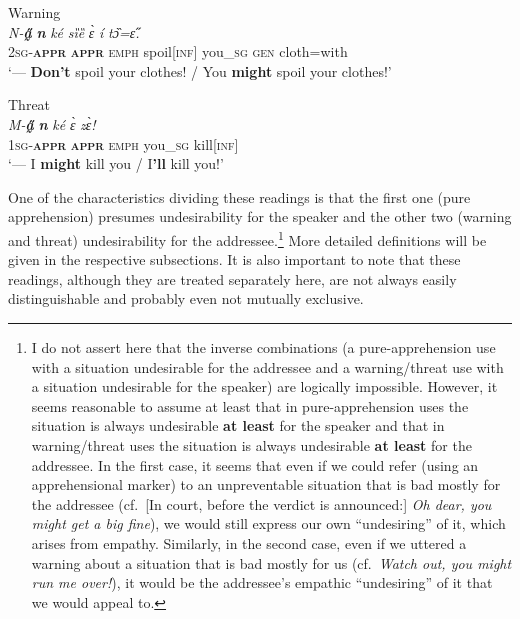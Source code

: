 \documentclass[output=paper,colorlinks,citecolor=brown
]{langscibook}
\begin{document}
\begin{exe} \ex \label{ex:Fed8} \textnormal{Warning} \\
\gll \textit{N-\textbf{a̰̋}} \textit{\textbf{n{\ù}}} \textit{ké} \textit{sȉȅ} \textit{ɛ̀} \textit{í} \textit{tɔ̏=ɛ̋.} \\
\textsc{2sg-\textbf{appr}} \textbf{\textsc{appr}} \textsc{emph} spoil\textsc{[inf]} you\_\textsc{sg} \textsc{gen} cloth=with \\
 `--- \textbf{Don't} spoil your clothes! / You \textbf{might} spoil your clothes!'
\end{exe}



\ea \label{ex:Fed9} \textnormal{Threat} \\
\gll \textit{M-\textbf{a̰̋}} \textit{\textbf{n{\ù}}} \textit{ké} \textit{ɛ̀} \textit{zɛ̀!} \\
\textsc{1sg-\textbf{appr}} \textsc{\textbf{appr}} \textsc{emph} you\_\textsc{sg} kill[\textsc{inf}] \\
 `--- I \textbf{might} kill you / I\textbf{'ll} kill you!'
\z

 One of the characteristics dividing these readings is that the first one (pure apprehension) presumes undesirability for the speaker and the other two (warning and threat) undesirability for the addressee.\footnote{I do not assert here that the inverse combinations (a pure-apprehension use with a situation undesirable for the addressee and a warning\slash threat use with a situation undesirable for the speaker) are logically impossible. However, it seems reasonable to assume at least that in pure-apprehension uses the situation is always undesirable \textbf{at least} for the speaker and that in warning\slash threat uses the situation is always undesirable \textbf{at least} for the addressee. In the first case, it seems that even if we could refer (using an apprehensional marker) to an unpreventable situation that is bad mostly for the addressee (cf.\ [In court, before the verdict is announced:] \textit{Oh dear, you might get a big fine}), we would still express our own ``undesiring'' of it, which arises from empathy. Similarly, in the second case, even if we uttered a warning about a situation that is bad mostly for us (cf.\ \textit{Watch out, you might run me over!}), it would be the addressee's empathic ``undesiring'' of it that we would appeal to.} More detailed definitions will be given in the respective subsections. It is also important to note that these readings, although they are treated separately here, are not always easily distinguishable and probably even not mutually exclusive.
\end{document}
